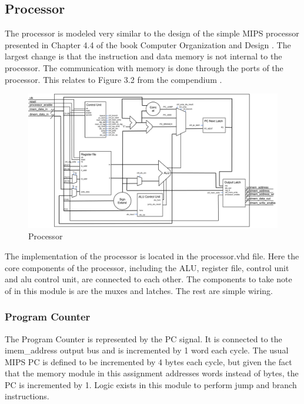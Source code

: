 \subsection{Processor}

The processor is modeled very similar to the design of the simple MIPS processor presented in Chapter 4.4 of the book Computer Organization and Design \cite{curriculum}. The largest change is that the instruction and data memory is not internal to the processor. The communication with memory is done through the ports of the processor. This relates to Figure 3.2 from the compendium \cite{compendium}. 

\begin{figure}[h]
	\centerline{\includegraphics[width=550px]{figures/processor.png}}
	\caption{Processor}
\end{figure}

The implementation of the processor is located in the processor.vhd file. Here the core components of the processor, including the ALU, register file, control unit and alu control unit, are connected to each other. The components to take note of in this module is are the muxes and latches. The rest are simple wiring. 

\subsubsection{Program Counter}
The Program Counter is represented by the PC signal. It is connected to the imem\_address output bus and is incremented by 1 word each cycle. The usual MIPS PC is defined to be incremented by 4 bytes each cycle, but given the fact that the memory module in this assignment addresses words instead of bytes, the PC is incremented by 1. Logic exists in this module to perform jump and branch instructions. 

